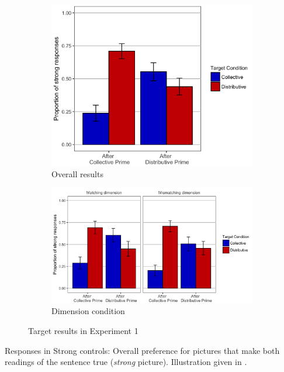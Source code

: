 \documentclass[a4paper, 11pt]{article}
\begin{document}
\begin{figure}[h!]
  \centering
  \begin{subfigure}[b]{0.45\textwidth}
    \includegraphics[width=\textwidth]{Targets-Experiment1.png}
         \caption{Overall results}
        \label{fig:targetresults.general}
     \end{subfigure}
          \begin{subfigure}[b]{0.5\textwidth}
    \includegraphics[width=\textwidth]{Targets-Experiment1-predicates.png}
             \caption{Dimension condition}
        \label{fig:targetresults.predicate}
      \end{subfigure}
      \caption{Target results in Experiment 1}
      \label{fig.targetresults.exp1}
\end{figure}


Responses in Strong controls: Overall preference for pictures that make both readings of the sentence true (\emph{strong} picture). Illustration given in .
\end{document}
